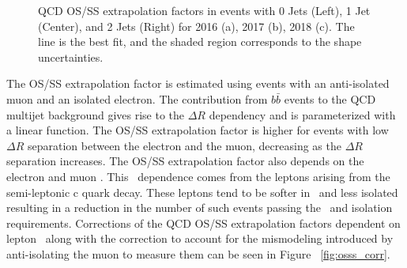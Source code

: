 \begin{figure}[htbp]
{  }
  \caption{QCD OS/SS extrapolation factors in events with 0 Jets (Left), 1 Jet (Center), and 2 Jets (Right) for 2016 (a), 2017 (b), 2018 (c). The line is the best fit, and the shaded region corresponds to the shape uncertainties.}
  \label{fig:osss}
\end{figure}

The OS/SS extrapolation factor is estimated using events with an anti-isolated muon and an isolated electron. The contribution from $b\bar{b}$ events to the QCD multijet background gives rise to the $\Delta R$ dependency and is parameterized with a linear function. The OS/SS extrapolation factor is higher for events with low $\Delta R $ separation between the electron and the muon, decreasing as the $\Delta R $ separation increases. The OS/SS extrapolation factor also depends on the electron and muon \pt. This \pt\, dependence comes from the leptons arising from the semi-leptonic c quark decay. These leptons tend to be softer in \pt\, and less isolated resulting in a reduction in the number of such events passing the \pt\, and isolation requirements. Corrections of the QCD OS/SS extrapolation factors dependent on lepton \pt\, along with the correction to account for the mismodeling introduced by anti-isolating the muon to measure them can be seen in Figure ~\ref{fig:osss_corr}.


